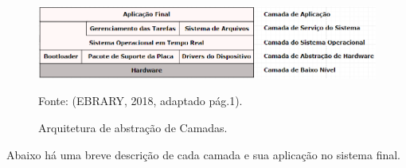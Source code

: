 \begin{figure}[h]
	\centering
	\caption{Arquitetura de abstração de Camadas.}
	
	\includegraphics[keepaspectratio=true,scale=0.7]{figuras/arquiteturaSof.PNG}
	
	Fonte: (EBRARY, 2018,  adaptado pág.1).
	\label{fig22}
\end{figure}

Abaixo há uma breve descrição de cada camada e sua aplicação no sistema final.

